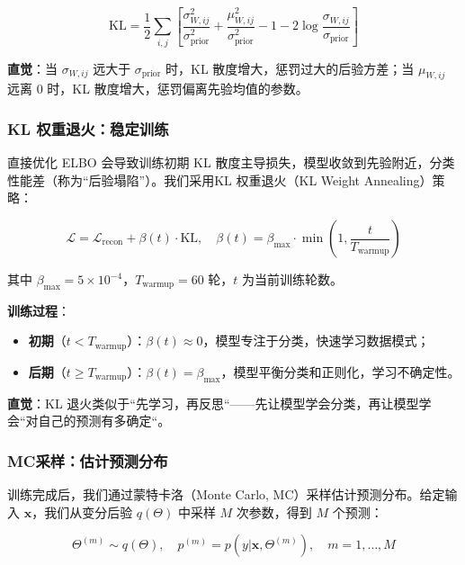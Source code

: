 \begin{equation}
\text{KL} = \frac{1}{2} \sum_{i,j} \left[ \frac{\sigma_{W,ij}^2}{\sigma_{\text{prior}}^2} + \frac{\mu_{W,ij}^2}{\sigma_{\text{prior}}^2} - 1 - 2\log\frac{\sigma_{W,ij}}{\sigma_{\text{prior}}} \right]
\end{equation}

\textbf{直觉}：当 $\sigma_{W,ij}$ 远大于 $\sigma_{\text{prior}}$ 时，KL 散度增大，惩罚过大的后验方差；当 $\mu_{W,ij}$ 远离 0 时，KL 散度增大，惩罚偏离先验均值的参数。

\subsubsection{KL 权重退火：稳定训练}

直接优化 ELBO 会导致训练初期 KL 散度主导损失，模型收敛到先验附近，分类性能差（称为``后验塌陷''）。我们采用KL 权重退火（KL Weight Annealing）策略：

\begin{equation}
\mathcal{L} = \mathcal{L}_{\text{recon}} + \beta(t) \cdot \text{KL}, \quad \beta(t) = \beta_{\max} \cdot \min\left(1, \frac{t}{T_{\text{warmup}}}\right)
\end{equation}

其中 $\beta_{\max}=5\times10^{-4}$，$T_{\text{warmup}}=60$ 轮，$t$ 为当前训练轮数。

\textbf{训练过程}：
\begin{itemize}
  \item \textbf{初期}（$t < T_{\text{warmup}}$）：$\beta(t) \approx 0$，模型专注于分类，快速学习数据模式；
  \item \textbf{后期}（$t \geq T_{\text{warmup}}$）：$\beta(t) = \beta_{\max}$，模型平衡分类和正则化，学习不确定性。
\end{itemize}

\textbf{直觉}：KL 退火类似于``先学习，再反思``——先让模型学会分类，再让模型学会``对自己的预测有多确定``。

\subsubsection{MC采样：估计预测分布}

训练完成后，我们通过蒙特卡洛（Monte Carlo, MC）采样估计预测分布。给定输入 $\mathbf{x}$，我们从变分后验 $q(\Theta)$ 中采样 $M$ 次参数，得到 $M$ 个预测：

\begin{equation}
\Theta^{(m)} \sim q(\Theta), \quad p^{(m)} = p(y | \mathbf{x}, \Theta^{(m)}), \quad m=1,\ldots,M
\end{equation}

